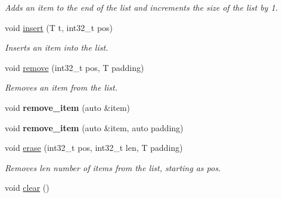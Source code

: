 \begin{DoxyCompactItemize}
\begin{DoxyCompactList}\small\item\em Adds an item to the end of the list and increments the size of the list by 1. \end{DoxyCompactList}\item 
void \hyperlink{classetk_1_1_list_aaad15082c3f17971d84890a33c523003}{insert} (T t, int32\-\_\-t pos)
\begin{DoxyCompactList}\small\item\em Inserts an item into the list. \end{DoxyCompactList}\item 
void \hyperlink{classetk_1_1_list_a2de9664a63f8996eeb3599e0b56a90d9}{remove} (int32\-\_\-t pos, T padding)
\begin{DoxyCompactList}\small\item\em Removes an item from the list. \end{DoxyCompactList}\item 
\hypertarget{classetk_1_1_list_a2b922183cf60d1bf3c351af927cfe51d}{void {\bfseries remove\-\_\-item} (auto \&item)}\label{classetk_1_1_list_a2b922183cf60d1bf3c351af927cfe51d}

\item 
\hypertarget{classetk_1_1_list_a96d289d0f4ee20ee260d885bceae3aca}{void {\bfseries remove\-\_\-item} (auto \&item, auto padding)}\label{classetk_1_1_list_a96d289d0f4ee20ee260d885bceae3aca}

\item 
void \hyperlink{classetk_1_1_list_aa43bb8a932f626f0b9a729c3bd2882a9}{erase} (int32\-\_\-t pos, int32\-\_\-t len, T padding)
\begin{DoxyCompactList}\small\item\em Removes len number of items from the list, starting as pos. \end{DoxyCompactList}\item 
\hypertarget{classetk_1_1_list_a429128ca6b0d5f9e97fdfd52b0190364}{void \hyperlink{classetk_1_1_list_a429128ca6b0d5f9e97fdfd52b0190364}{clear} ()}\label{classetk_1_1_list_a429128ca6b0d5f9e97fdfd52b0190364}


\end{DoxyCompactItemize}
